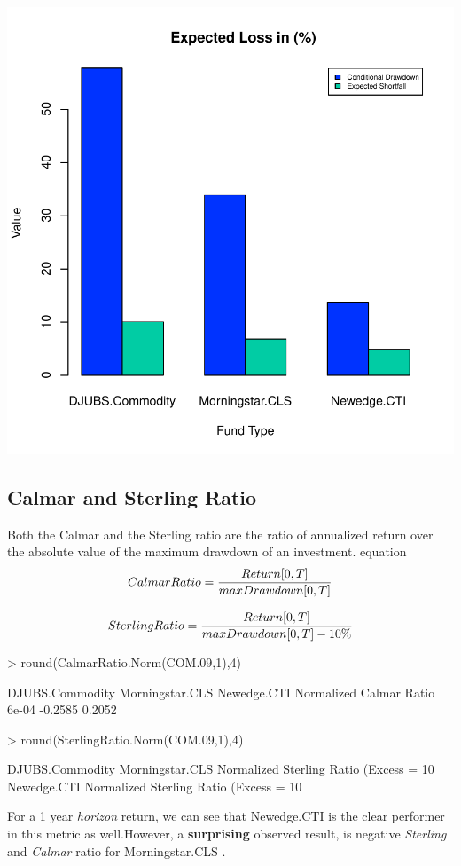 \documentclass[12pt,letterpaper,english]{article}
\begin{document}
\includegraphics{Commodity-007}
\subsection{Calmar and Sterling Ratio}
Both the Calmar and the Sterling ratio are the ratio of annualized return over the absolute value of the maximum drawdown of an investment.
{equation}
\begin{equation}
 Calmar Ratio  =  \frac{Return [0,T]}{max Drawdown  [0,T]} \\
\end{equation}

\begin{equation}
 Sterling Ratio  =  \frac{Return [0,T]}{max Drawdown  [0,T] - 10\%} \\
\end{equation}
\begin{Schunk}
\begin{Sinput}
> round(CalmarRatio.Norm(COM.09,1),4)
\end{Sinput}
\begin{Soutput}
                        DJUBS.Commodity Morningstar.CLS Newedge.CTI
Normalized Calmar Ratio           6e-04         -0.2585      0.2052
\end{Soutput}
\begin{Sinput}
> round(SterlingRatio.Norm(COM.09,1),4)
\end{Sinput}
\begin{Soutput}
                                         DJUBS.Commodity Morningstar.CLS
Normalized Sterling Ratio (Excess = 10%
                                         Newedge.CTI
Normalized Sterling Ratio (Excess = 10%
\end{Soutput}
\end{Schunk}
For a 1 year \emph{horizon} return, we can see that Newedge.CTI is the clear performer in this metric as well.However, a \textbf{surprising} observed result, is negative \emph{Sterling} and \emph{Calmar} ratio for Morningstar.CLS . 
\end{document}
